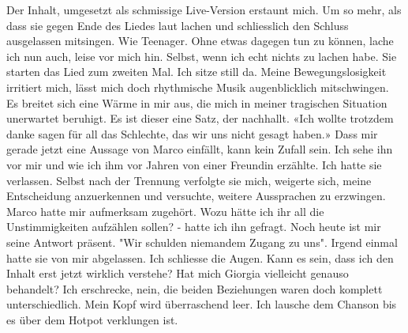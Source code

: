 Der Inhalt, umgesetzt als schmissige Live-Version erstaunt mich. Um so mehr, als dass sie gegen Ende des Liedes laut lachen und  schliesslich den Schluss ausgelassen mitsingen. Wie Teenager. Ohne etwas
dagegen tun zu können, lache ich nun auch, leise vor mich hin. Selbst,
wenn ich echt nichts zu lachen habe. Sie starten das Lied zum zweiten Mal.
Ich sitze still da. Meine Bewegungslosigkeit irritiert mich, lässt mich doch rhythmische Musik 
augenblicklich mitschwingen. Es breitet sich eine Wärme in mir aus, 
die mich in meiner tragischen Situation unerwartet beruhigt. Es ist dieser eine Satz, der nachhallt. 
«Ich wollte trotzdem danke sagen für all das Schlechte, das wir uns nicht gesagt haben.» 
Dass mir gerade jetzt eine Aussage von Marco einfällt, kann kein Zufall sein.
Ich sehe ihn vor mir und wie ich ihm vor Jahren von einer Freundin erzählte. Ich hatte sie verlassen. 
Selbst nach der Trennung verfolgte sie mich, weigerte sich, meine Entscheidung anzuerkennen und 
versuchte, weitere Aussprachen zu erzwingen. Marco hatte mir aufmerksam zugehört. 
Wozu hätte ich ihr all die Unstimmigkeiten aufzählen sollen? - hatte ich ihn gefragt.
Noch heute ist mir seine Antwort präsent. 
"Wir schulden niemandem Zugang zu uns".  
Irgend einmal hatte sie von mir abgelassen. 
Ich schliesse die Augen. Kann es sein, dass ich den Inhalt erst jetzt wirklich verstehe? 
Hat mich Giorgia vielleicht genauso behandelt? Ich erschrecke, nein, die beiden Beziehungen waren doch komplett unterschiedlich. Mein Kopf wird überraschend leer. 
Ich lausche dem Chanson bis es über dem Hotpot verklungen ist.

